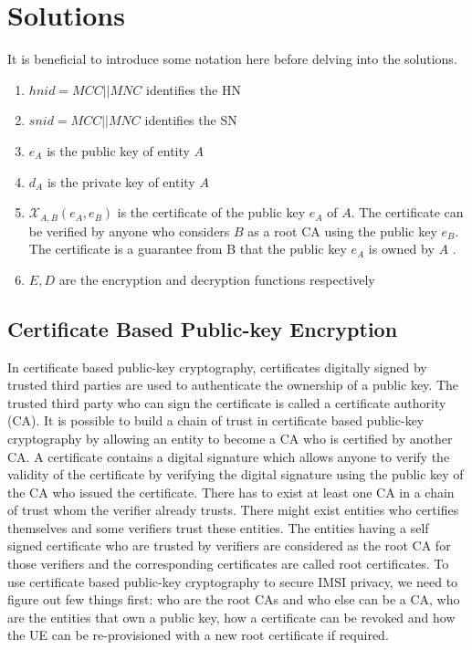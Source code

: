 \documentclass[lnicst,sechang,a4paper]{svmultln}
\begin{document}
\section{Solutions}\label{sec:solutions} 
\label{sec:solutions}
It is beneficial to introduce some notation here before delving into the solutions. 
\begin{enumerate}
\item $hnid=MCC||MNC$ identifies the HN
\item $snid=MCC||MNC$ identifies the SN
\item $e_A$ is the public key of entity $A$
\item $d_A$ is the private key of entity $A$ 
\item $\mathcal{X}_{A,B}(e_A,e_B)$ is the certificate of the public key $e_A$ of $A$. The certificate can be verified by anyone who considers $B$ as a root CA using the public key $e_B$. The certificate is a guarantee from B that the public key $e_A$ is owned by $A$ .
\item $E,D$ are the encryption and decryption functions respectively
\end{enumerate}


\subsection{Certificate Based Public-key Encryption} 
\label{sub_sec:solution_certificate}
In certificate based public-key cryptography, certificates digitally signed by trusted third parties are used to authenticate the ownership of a public key. The trusted third party who can sign the certificate is called a certificate authority (CA). It is possible to build a chain of trust in certificate based public-key cryptography by allowing an entity to become a CA who is certified by another CA. A certificate contains a digital signature which allows anyone to verify the validity of the certificate by verifying the digital signature using the public key of the CA who issued the certificate. There has to exist at least one CA in a chain of trust whom the verifier already trusts. There might exist entities who certifies themselves and some verifiers trust these entities. The entities having a self signed certificate who are trusted by verifiers are considered as the root CA for those verifiers and the corresponding certificates are called root certificates. To use certificate based public-key cryptography to secure IMSI privacy, we need to figure out few things first: who are the root CAs and who else can be a CA, who are the entities that own a public key, how a certificate can be revoked and how the UE can be re-provisioned with a new root certificate if required.
\end{document}
